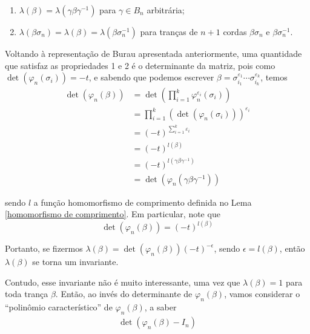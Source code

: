 	\begin{enumerate}
		\item $\lambda(\beta) = \lambda(\gamma\beta\gamma^{-1})$ para $\gamma\in B_n$ arbitrária;
		\item $\lambda(\beta\sigma_n) = \lambda(\beta) = \lambda(\beta\sigma_n^{-1})$ para tranças de $n+1$ cordas $\beta\sigma_n$ e $\beta\sigma_n^{-1}$.
	\end{enumerate}
	\par\vspace{0.3cm} Voltando à representação de Burau apresentada anteriormente, uma quantidade que satisfaz as propriedades 1 e 2 é o determinante da matriz, pois como $\det(\varphi_n(\sigma_i)) = -t$, e sabendo que podemos escrever $\beta = \sigma_{i_1}^{\varepsilon_1}\cdots\sigma_{i_k}^{\varepsilon_k}$, temos
	\begin{align*} 
	\det(\varphi_n(\beta)) 
	&= 
	\det\left( \prod_{i=1}^{k}\varphi_n^{\varepsilon_i}(\sigma_i) \right)
	\\ 
	&= \prod_{i=1}^{k}(\det(\varphi_n(\sigma_i)))^{\varepsilon_i}
	\\ 
	&= (-t)^{\sum_{i=1}^{k}\varepsilon_i}
	\\
	&=(-t)^{l(\beta)} 
	\\
	&=(-t)^{l(\gamma\beta\gamma^{-1})} 
	\\
	&=\det(\varphi_n(\gamma\beta\gamma^{-1}))
	\end{align*} 
	\par\vspace{0.3cm} sendo $l$ a função homomorfismo de comprimento definida no Lema \eqref{homomorfismo de comprimento}. Em particular, note que
	\begin{equation}
	\label{det Burau de beta}
	\det(\varphi_n(\beta)) = (-t)^{l(\beta)}
	\end{equation}
	\par \vspace{0.3cm} Portanto, se fizermos $\lambda(\beta) = \det(\varphi_n(\beta))(-t)^{-\epsilon}$, sendo $\epsilon=l(\beta)$, então $\lambda(\beta)$ se torna um invariante. 
	\par\vspace{0.3cm} Contudo, esse invariante não é muito interessante, uma vez que $\lambda(\beta) = 1$ para toda trança $\beta$. Então, ao invés do determinante de $\varphi_n(\beta)$, vamos considerar o ``polinômio característico'' de $\varphi_n(\beta)$, a saber
	\begin{align*}
	\det(\varphi_n(\beta) - I_n)
	\end{align*}
